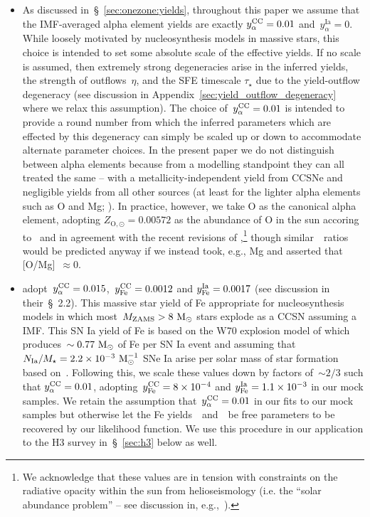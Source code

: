 \documentclass[ms.tex]{subfiles}
\begin{document}
\begin{itemize}
	\item As discussed in~\S~\ref{sec:onezone:yields}, throughout this paper
	we assume that the IMF-averaged alpha element yields are exactly
	$y_\alpha^\text{CC} = 0.01$ and~$y_\alpha^\text{Ia} = 0$.
	While loosely motivated by nucleosynthesis models in massive stars, this
	choice is intended to set some absolute scale of the effective yields.
	If no scale is assumed, then extremely strong degeneracies arise in the
	inferred yields, the strength of outflows~$\eta$, and the SFE timescale
	$\tau_\star$ due to the yield-outflow degeneracy (see discussion in
	Appendix~\ref{sec:yield_outflow_degeneracy} where we relax this assumption).
	The choice of~$y_\alpha^\text{CC} = 0.01$ is intended to provide a round number from
	which the inferred parameters which are effected by this degeneracy can
	simply be scaled up or down to accommodate alternate parameter choices.
	In the present paper we do not distinguish between alpha elements because
	from a modelling standpoint they can all treated the same -- with a
	metallicity-independent yield from CCSNe and negligible yields from all
	other sources (at least for the lighter alpha elements such as O and Mg;
	\citealp{Johnson2019}).
	In practice, however, we take O as the canonical alpha element, adopting
	$Z_{\text{O},\odot} = 0.00572$ as the abundance of O in the sun accoring
	to~\citet{Asplund2009} and in agreement with the recent revisions of
	\citet*{Asplund2021},\footnote{
		We acknowledge that these values are in tension with constraints on the
		radiative opacity within the sun from helioseismology (i.e. the ``solar
		abundance problem'' -- see discussion in, e.g.,~\citealp*{Serenelli2011,
		Haxton2013, Bergemann2014}).
	} though similar~\afe~ratios would be predicted anyway if we instead took,
	e.g., Mg and asserted that [O/Mg]~$\approx 0$.

	\item \citet{Weinberg2017} adopt~$y_\alpha^\text{CC} = 0.015$,~$y_\text{Fe}^\text{CC} = 0.0012$ and
	$y_\text{Fe}^\text{Ia} = 0.0017$ (see discussion in their~\S~2.2).
	This massive star yield of Fe appropriate for nucleosynthesis models in
	which most~$M_\text{ZAMS} > 8~\text{M}_\odot$ stars explode as a CCSN
	\citep[e.g.][]{Chieffi2004, Chieffi2013, Nomoto2013, Woosley1995} assuming
	a~\citet{Kroupa2001} IMF.
	This SN Ia yield of Fe is based on the W70 explosion model of
	\citet{Iwamoto1999} which produces~$\sim0.77~\text{M}_\odot$ of Fe per SN Ia event
	and assuming that~$N_\text{Ia} / M_\star = 2.2\times10^{-3}~\text{M}_\odot^{-1}$
	SNe Ia arise per solar mass of star formation based on~\citet{Maoz2012a}.
	Following this, we scale these values down by factors of~$\sim2/3$ such
	that $y_\alpha^\text{CC} = 0.01$, adopting~$y_\text{Fe}^\text{CC} = 8\times10^{-4}$ and
	$y_\text{Fe}^\text{Ia} = 1.1\times10^{-3}$ in our mock samples.
	We retain the assumption that~$y_\alpha^\text{CC} = 0.01$ in our fits to our mock
	samples but otherwise let the Fe yields~\yfecc~and~\yfeia~be free
	parameters to be recovered by our likelihood function.
	We use this procedure in our application to the H3 survey
	in~\S~\ref{sec:h3} below as well.


\end{itemize}
\end{document}
